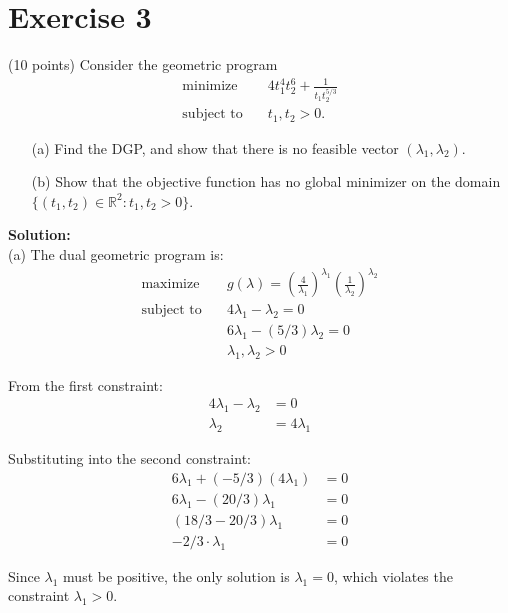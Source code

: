 \documentclass{article}
\begin{document}
\newpage

\section*{Exercise 3}
(10 points) Consider the geometric program
\begin{align*}
\text{minimize} \quad & 4t_1^4 t_2^6 + \frac{1}{t_1 t_2^{5/3}} \\
\text{subject to} \quad & t_1, t_2 > 0.
\end{align*}

\begin{itemize}
    \item[(a)] Find the DGP, and show that there is no feasible vector $(\lambda_1, \lambda_2)$.
    \item[(b)] Show that the objective function has no global minimizer on the domain $\{(t_1, t_2) \in \mathbb{R}^2 : t_1, t_2 > 0\}$.
\end{itemize}

\textbf{Solution:} \\

(a) The dual geometric program is:
\begin{align*}
\text{maximize} \quad & g(\lambda) = \left(\frac{4}{\lambda_1}\right)^{\lambda_1} \left(\frac{1}{\lambda_2}\right)^{\lambda_2} \\
\text{subject to} \quad & 4 \lambda_1 - \lambda_2 = 0 \\
& 6 \lambda_1 - (5/3) \lambda_2 = 0 \\
& \lambda_1, \lambda_2 > 0
\end{align*}

From the first constraint:
\begin{align*}
4\lambda_1 - \lambda_2 &= 0 \\
\lambda_2 &= 4\lambda_1
\end{align*}

Substituting into the second constraint:
\begin{align*}
6\lambda_1 + (-5/3)(4\lambda_1) &= 0 \\
6\lambda_1 - (20/3)\lambda_1 &= 0 \\
(18/3 - 20/3)\lambda_1 &= 0 \\
-2/3 \cdot \lambda_1 &= 0
\end{align*}

Since $\lambda_1$ must be positive, the only solution is $\lambda_1 = 0$, which violates the constraint $\lambda_1 > 0$. \\
\end{document}
